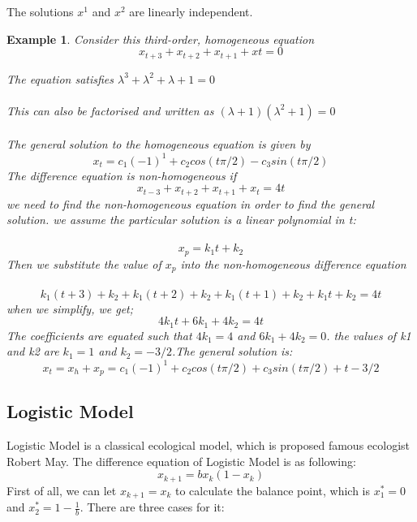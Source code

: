 \documentclass[12pt]{article}
\newtheorem{example}{Example}[section]
\begin{document}
The solutions $x^1$ and $x^2$ are linearly independent.

\begin{example}
Consider this third-order, homogeneous equation
\begin{equation*}
    x_{t+3}+x_{t+2}+x_{t+1}+x{t}=0\tag{1.4.1.3}
\end{equation*}

The equation satisfies $\lambda^3+\lambda^2+\lambda+1=0$ \\\\
This can also be factorised and written as $(\lambda+1)(\lambda^2+1)=0$\\\\
The general solution to the homogeneous equation is given by
\begin{equation*}
    x_t=c_1(-1)^1+c_2cos(t\pi/2)-c_3sin(t\pi/2)\tag{1.4.1.4}
\end{equation*}
The difference equation is non-homogeneous if
\begin{equation*}
    x_{t-3}+x_{t+2}+x_{t+1}+x_{t}=4t\tag{1.4.1.5}
\end{equation*}
we need to find the non-homogeneous equation in order to find the general solution. we assume the particular solution is a linear polynomial in t:\\\\
\begin{equation*}
    x_p=k_1t+k_2\tag{1.4.1.6}
\end{equation*}
Then we substitute the value of $x_p$ into the non-homogeneous difference equation\\\\
\begin{equation*}
    k_1(t+3)+k_2+k_1(t+2)+k_2+k_1(t+1)+k_2+k_1t+k_2=4t\tag{1.4.1.7}
\end{equation*}
when we simplify, we get;
\begin{equation*}
    4k_1t+6k_1+4k_2=4t\tag{1.4.1.8}
\end{equation*}
The coefficients are equated such that $4k_1=4$ and $6k_1+4k_2=0$. the values of k1 and k2 are $k_1=1$ and $k_2=-3/2$.The general solution is:
\begin{equation*}
    x_t=x_h+x_p=c_1(-1)^1+c_2cos(t\pi/2)+c_3sin(t\pi/2)+t-3/2\tag{1.4.1.9}
\end{equation*}

\end{example}
\subsection{Logistic Model}
Logistic Model is a classical ecological model, which is proposed famous ecologist Robert May. The difference equation of Logistic Model is as following:
\begin{equation}
    x_{k+1} = bx_k(1-x_k)\tag{1.5.1}
\end{equation}
First of all, we can let $x_{k+1} = x_k$ to calculate the balance point, which is $x_1^* = 0$ and $x_2^* = 1 - \frac{1}{b}$. There are three cases for it:
\end{document}
